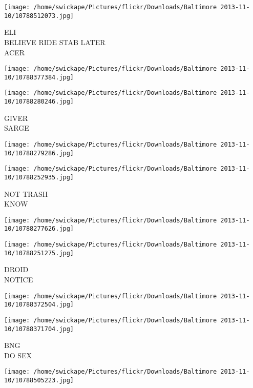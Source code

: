 \documentclass[10pt,letterpaper]{article}
\begin{document}
\vspace{0.25in}
\texttt{[image: /home/swickape/Pictures/flickr/Downloads/Baltimore 2013-11-10/10788512073.jpg]}

ELI\\
BELIEVE RIDE STAB LATER\\
ACER\\
\pagebreak

\texttt{[image: /home/swickape/Pictures/flickr/Downloads/Baltimore 2013-11-10/10788377384.jpg]}

\vspace{0.25in}
\texttt{[image: /home/swickape/Pictures/flickr/Downloads/Baltimore 2013-11-10/10788280246.jpg]}

GIVER\\
SARGE\\
\pagebreak

\texttt{[image: /home/swickape/Pictures/flickr/Downloads/Baltimore 2013-11-10/10788279286.jpg]}

\vspace{0.25in}
\texttt{[image: /home/swickape/Pictures/flickr/Downloads/Baltimore 2013-11-10/10788252935.jpg]}

NOT TRASH\\
KNOW\\
\pagebreak

\texttt{[image: /home/swickape/Pictures/flickr/Downloads/Baltimore 2013-11-10/10788277626.jpg]}

\vspace{0.25in}
\texttt{[image: /home/swickape/Pictures/flickr/Downloads/Baltimore 2013-11-10/10788251275.jpg]}

DROID\\
NOTICE\\
\pagebreak

\texttt{[image: /home/swickape/Pictures/flickr/Downloads/Baltimore 2013-11-10/10788372504.jpg]}

\vspace{0.25in}
\texttt{[image: /home/swickape/Pictures/flickr/Downloads/Baltimore 2013-11-10/10788371704.jpg]}

BNG\\
DO SEX\\
\pagebreak

\texttt{[image: /home/swickape/Pictures/flickr/Downloads/Baltimore 2013-11-10/10788505223.jpg]}
\end{document}
